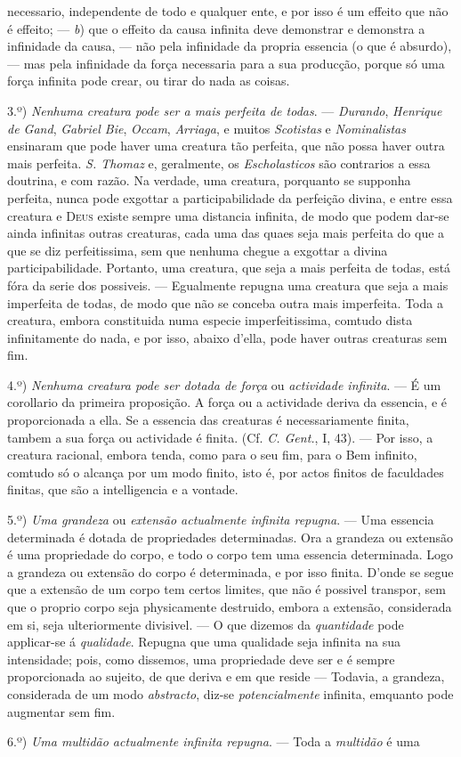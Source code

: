 necessario, independente de todo e qualquer ente, e por isso é um effeito que não é effeito; --- \emph{b}) que o effeito da causa infinita deve demonstrar e demonstra a infinidade da causa, --- não pela infinidade da propria essencia (o que é absurdo), --- mas pela infinidade da força necessaria para a sua producção, porque só uma força infinita pode crear, ou tirar do nada as coisas.\par 3.º) \emph{Nenhuma creatura pode ser a mais perfeita de todas}. --- \emph{Durando}, \emph{Henrique de Gand}, \emph{Gabriel Bie}, \emph{Occam}, \emph{Arriaga}, e muitos \emph{Scotistas} e \emph{Nominalistas} ensinaram que pode haver uma creatura tão perfeita, que não possa haver outra mais perfeita. \emph{S. Thomaz} e, geralmente, os \emph{Escholasticos} são contrarios a essa doutrina, e com razão. Na verdade, uma creatura, porquanto se supponha perfeita, nunca pode exgottar a participabilidade da perfeição divina, e entre essa creatura e \textsc{Deus} existe sempre uma distancia infinita, de modo que podem dar-se ainda infinitas outras creaturas, cada uma das quaes seja mais perfeita do que a que se diz perfeitissima, sem que nenhuma chegue a exgottar a divina participabilidade. Portanto, uma creatura, que seja a mais perfeita de todas, está fóra da serie dos possiveis. --- Egualmente repugna uma creatura que seja a mais imperfeita de todas, de modo que não se conceba outra mais imperfeita. Toda a creatura, embora constituida numa especie imperfeitissima, comtudo dista infinitamente do nada, e por isso, abaixo d'ella, pode haver outras creaturas sem fim.\par 4.º) \emph{Nenhuma creatura pode ser dotada de força} ou \emph{actividade infinita}. --- É um corollario da primeira proposição. A força ou a actividade deriva da essencia, e é proporcionada a ella. Se a essencia das creaturas é necessariamente finita, tambem a sua força ou actividade é finita. (Cf. \emph{C. Gent.}, I, 43). --- Por isso, a creatura racional, embora tenda, como para o seu fim, para o Bem infinito, comtudo só o alcança por um modo finito, isto é, por actos finitos de faculdades finitas, que são a intelligencia e a vontade.\par 5.º) \emph{Uma grandeza} ou \emph{extensão actualmente infinita repugna}. --- Uma essencia determinada é dotada de propriedades determinadas. Ora a grandeza ou extensão é uma propriedade do corpo, e todo o corpo tem uma essencia determinada. Logo a grandeza ou extensão do corpo é determinada, e por isso finita. D'onde se segue que a extensão de um corpo tem certos limites, que não é possivel transpor, sem que o proprio corpo seja physicamente destruido, embora a extensão, considerada em si, seja ulteriormente divisivel. --- O que dizemos da \emph{quantidade} pode applicar-se á \emph{qualidade}. Repugna que uma qualidade seja infinita na sua intensidade; pois, como dissemos, uma propriedade deve ser e é sempre proporcionada ao sujeito, de que deriva e em que reside --- Todavia, a grandeza, considerada de um modo \emph{abstracto}, diz-se \emph{potencialmente} infinita, emquanto pode augmentar sem fim.\par 6.º) \emph{Uma multidão actualmente infinita repugna}. --- Toda a \emph{multidão} é uma 